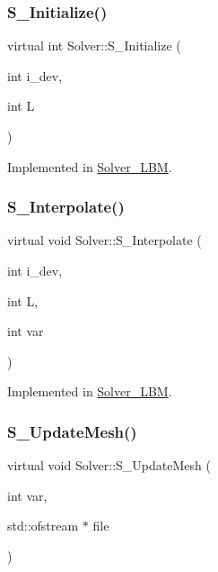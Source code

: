 \mbox{\label{classSolver_a52e834a160622462bec7c40054702270}} 
\subsubsection{\texorpdfstring{S\+\_\+\+Initialize()}{S\_Initialize()}}
{\footnotesize\ttfamily virtual int Solver\+::\+S\+\_\+\+Initialize (\begin{DoxyParamCaption}\item[{int}]{i\+\_\+dev,  }\item[{int}]{L }\end{DoxyParamCaption})\hspace{0.3cm}{\ttfamily [pure virtual]}}



Implemented in \hyperlink{classSolver__LBM_a215918c1e81dc85315651948bbc86173}{Solver\+\_\+\+L\+BM}.

\mbox{\label{classSolver_a5b3e7308e48b43f75b09ddd425e11cfd}} 
\subsubsection{\texorpdfstring{S\+\_\+\+Interpolate()}{S\_Interpolate()}}
{\footnotesize\ttfamily virtual void Solver\+::\+S\+\_\+\+Interpolate (\begin{DoxyParamCaption}\item[{int}]{i\+\_\+dev,  }\item[{int}]{L,  }\item[{int}]{var }\end{DoxyParamCaption})\hspace{0.3cm}{\ttfamily [pure virtual]}}



Implemented in \hyperlink{classSolver__LBM_a1ae0246ed9aa764eafce29a5f7ef7d42}{Solver\+\_\+\+L\+BM}.

\mbox{\label{classSolver_a8c73af137ee8c7ab25d8195448088a7b}} 
\subsubsection{\texorpdfstring{S\+\_\+\+Update\+Mesh()}{S\_UpdateMesh()}}
{\footnotesize\ttfamily virtual void Solver\+::\+S\+\_\+\+Update\+Mesh (\begin{DoxyParamCaption}\item[{int}]{var,  }\item[{std\+::ofstream $\ast$}]{file }\end{DoxyParamCaption})\hspace{0.3cm}{\ttfamily [pure virtual]}}



